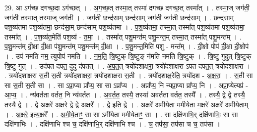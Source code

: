 \documentclass[17pt]{extarticle}
\begin{document}
29. आ ऽग॑च्छ दगच्छ॒दा ऽग॑च्छत् । . अ॒ग॒च्छ॒त् तस्मा॒त् तस्मा॑ दगच्छ दगच्छ॒त् तस्मा᳚त् । . तस्मा॒ज् जग॑ती॒ जग॑ती॒ तस्मा॒त् तस्मा॒ज् जग॑ती । . जग॑ती॒ छन्द॑सा॒म् छन्द॑सा॒म् जग॑ती॒ जग॑ती॒ छन्द॑साम् । . छन्द॑साम् पश॒व्य॑तमा पश॒व्य॑तमा॒ छन्द॑सा॒म् छन्द॑साम् पश॒व्य॑तमा । . प॒श॒व्य॑तमा॒ तस्मा॒त् तस्मा᳚त् पश॒व्य॑तमा पश॒व्य॑तमा॒ तस्मा᳚त् । . प॒श॒व्य॑त॒मेति॑ पश॒व्य॑ - त॒मा॒ । . तस्मा᳚त् पशु॒मन्त॑म् पशु॒मन्त॒म् तस्मा॒त् तस्मा᳚त् पशु॒मन्त᳚म् । . प॒शु॒मन्त॑म् दी॒क्षा दी॒क्षा प॑शु॒मन्त॑म् पशु॒मन्त॑म् दी॒क्षा । . प॒शु॒मन्त॒मिति॑ पशु - मन्त᳚म् । . दी॒क्षो पोप॑ दी॒क्षा दी॒क्षोप॑ । . उप॑ नमति नम॒ त्युपोप॑ नमति । . न॒म॒ति॒ त्रि॒ष्टुक् त्रि॒ष्टुङ् न॑मति नमति त्रि॒ष्टुक् । . त्रि॒ष्टु गुदुत् त्रि॒ष्टुक् त्रि॒ष्टु गुत् । . उद॑पत दपत॒ दुदु द॑पतत् । . अ॒प॒त॒त् त्रयो॑दशाक्षरा॒ त्रयो॑दशाक्षरा ऽपत दपत॒त् त्रयो॑दशाक्षरा । . त्रयो॑दशाक्षरा स॒ती स॒ती त्रयो॑दशाक्षरा॒ त्रयो॑दशाक्षरा स॒ती । . त्रयो॑दशाक्ष॒रेति॒ त्रयो॑दश - अ॒क्ष॒रा॒ । . स॒ती सा सा स॒ती स॒ती सा । . सा ऽप्रा॒प्या प्रा᳚प्य॒ सा सा ऽप्रा᳚प्य । . अप्रा᳚प्य॒ नि न्यप्रा॒प्या प्रा᳚प्य॒ नि । . अप्रा॒प्येत्यप्र॑ - आ॒प्य॒ । . न्य॑वर्तता वर्तत॒ नि न्य॑वर्तत । . अ॒व॒र्त॒त॒ तस्यै॒ तस्या॑ अवर्तता वर्तत॒ तस्यै᳚ । . तस्यै॒ द्वे द्वे तस्यै॒ तस्यै॒ द्वे । . द्वे अ॒क्षरे॑ अ॒क्षरे॒ द्वे द्वे अ॒क्षरे᳚ । . द्वे इति॒ द्वे । . अ॒क्षरे॑ अमीयेता ममीयेता म॒क्षरे॑ अ॒क्षरे॑ अमीयेताम् । . अ॒क्षरे॒ इत्य॒क्षरे᳚ । . अ॒मी॒ये॒ताꣳ॒॒ सा सा ऽमी॑येता ममीयेताꣳ॒॒ सा । . सा दक्षि॑णाभि॒र् दक्षि॑णाभिः॒ सा सा दक्षि॑णाभिः । . दक्षि॑णाभि श्च च॒ दक्षि॑णाभि॒र् दक्षि॑णाभि श्च । . च॒ तप॑सा॒ तप॑सा च च॒ तप॑सा । \newline
\end{document}
